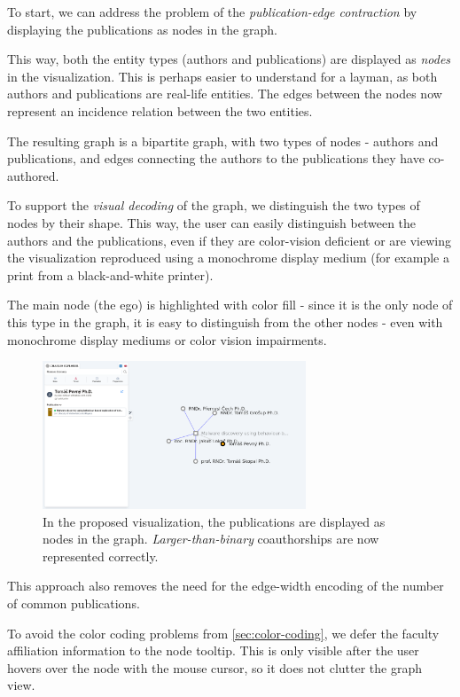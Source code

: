 To start, we can address the problem of the \textit{publication-edge contraction} by displaying the publications as nodes in the graph.

This way, both the entity types (authors and publications) are displayed as \textit{nodes} in the visualization.
This is perhaps easier to understand for a layman, as both authors and publications are real-life entities. 
The edges between the nodes now represent an incidence relation between the two entities.

The resulting graph is a bipartite graph, with two types of nodes - authors and publications, and edges connecting the authors to the publications they have co-authored.

To support the \textit{visual decoding} of the graph, we distinguish the two types of nodes by their shape. 
This way, the user can easily distinguish between the authors and the publications, even if they are color-vision deficient 
or are viewing the visualization reproduced using a monochrome display medium (for example a print from a black-and-white printer).

The main node (the ego) is highlighted with color fill - since it is the only node of this type in the graph,
it is easy to distinguish from the other nodes - even with monochrome display mediums or color vision impairments.

\begin{figure}[ht!]
    \captionsetup{width=.9\linewidth}
    \includegraphics[width=0.7\textwidth]{../img/publications-and-people.png}
    \centering
    \caption{In the proposed visualization, the publications are displayed as nodes in the graph. \textit{Larger-than-binary} coauthorships are now represented correctly.}
\end{figure}

This approach also removes the need for the edge-width encoding of the number of common publications.

To avoid the color coding problems from \ref{sec:color-coding}, we defer the faculty affiliation information to the node tooltip.
This is only visible after the user hovers over the node with the mouse cursor, so it does not clutter the graph view.

